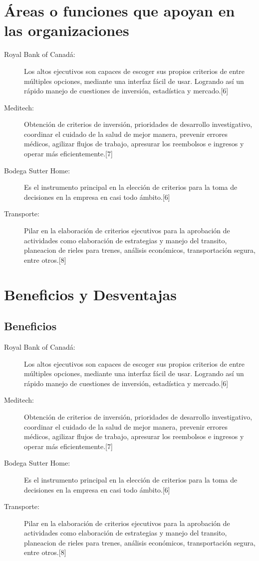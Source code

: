 \section {Áreas o funciones que apoyan en las organizaciones}
\begin{description}
\item [Royal Bank of Canadá:] Los altos ejecutivos son capaces de escoger sus propios criterios de entre múltiples opciones, mediante una interfaz fácil de usar. Logrando así un rápido manejo de cuestiones de inversión, estadística y mercado.[6]
\item [Meditech:] Obtención de criterios de inversión, prioridades de desarrollo investigativo, coordinar el cuidado de la salud de mejor manera, prevenir errores médicos, agilizar flujos de trabajo, apresurar los reembolsos e ingresos y operar más eficientemente.[7]
\item [Bodega Sutter Home:] Es el instrumento principal en la elección de criterios para la toma de decisiones en la empresa en casi todo ámbito.[6]
\item [Transporte:] Pilar en la elaboración de criterios ejecutivos para la aprobación de actividades como elaboración de estrategias y manejo del transito, planeacion de rieles para trenes, análisis económicos, transportación segura, entre otros.[8]
\end{description}

\section {Beneficios y Desventajas}

\subsection{Beneficios}
\begin{description}
\item [Royal Bank of Canadá:] Los altos ejecutivos son capaces de escoger sus propios criterios de entre múltiples opciones, mediante una interfaz fácil de usar. Logrando así un rápido manejo de cuestiones de inversión, estadística y mercado.[6]
\item [Meditech:] Obtención de criterios de inversión, prioridades de desarrollo investigativo, coordinar el cuidado de la salud de mejor manera, prevenir errores médicos, agilizar flujos de trabajo, apresurar los reembolsos e ingresos y operar más eficientemente.[7]
\item [Bodega Sutter Home:] Es el instrumento principal en la elección de criterios para la toma de decisiones en la empresa en casi todo ámbito.[6]
\item [Transporte:] Pilar en la elaboración de criterios ejecutivos para la aprobación de actividades como elaboración de estrategias y manejo del transito, planeacion de rieles para trenes, análisis económicos, transportación segura, entre otros.[8]
\end{description}

